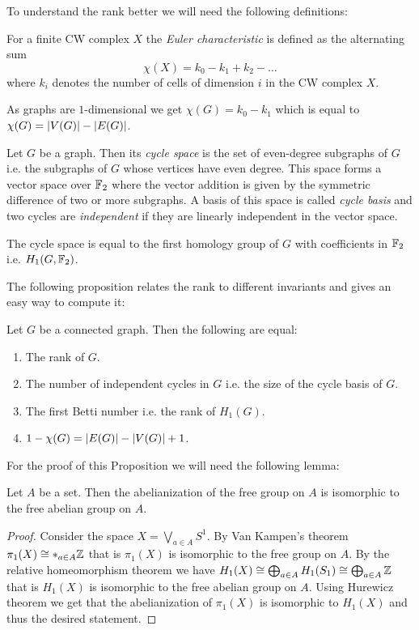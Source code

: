 To understand the rank better we will need the following definitions:
\begin{definition}
	For a finite CW complex $X$ the \emph{Euler characteristic} is defined as the alternating sum
	\[
		\chi(X) = k_0 - k_1 + k_2 - \ldots
	\] 
	where $k_{i}$ denotes the number of cells of dimension $i$ in the CW complex $X$.
\end{definition}
As graphs are $1$-dimensional we get $\chi (G) = k_0 - k_1$ which is equal to $\chi(G) = \abs{V(G)} - \abs{E(G)}$.

\begin{definition}
	Let $G$ be a graph. Then its \emph{cycle space} is the set of even-degree subgraphs of $G$ i.e. the subgraphs of $G$ whose vertices have even degree. 
	This space forms a vector space over $\mathbb{F}_2$ where the vector addition is given by the symmetric difference of two or more subgraphs.
	A basis of this space is called \emph{cycle basis} and two cycles are \emph{independent} if they are linearly independent in the vector space.
\end{definition}

\begin{remark}
	The cycle space is equal to the first homology group of $G$ with coefficients in $\mathbb{F}_2$ i.e. $H_1(G,\mathbb{F}_2)$.
\end{remark}

The following proposition relates the rank to different invariants and gives an easy way to compute it: 
\begin{proposition}\label{prop:rank}
	Let $G$ be a connected graph. Then the following are equal:
	\begin{enumerate}
		\item The rank of $G$.
		\item The number of independent cycles in $G$ i.e. the size of the cycle basis of $G$.
		\item The first Betti number i.e. the rank of $H_{1}(G)$.
		\item $1 - \chi(G) = \abs{E(G)} - \abs{V(G)} + 1$.
	\end{enumerate}
\end{proposition}

For the proof of this Proposition we will need the following lemma:
\begin{lemma}
	Let $A$ be a set. Then the abelianization of the free group on $A$ is isomorphic to the free abelian group on $A$.
\end{lemma}

\begin{proof}
	Consider the space $X = \bigvee_{a \in A} S^{1}$. By Van Kampen's theorem $\pi_1(X) \cong *_{a \in A} \mathbb{Z}$ that is $\pi_1(X)$ is isomorphic to the free group on $A$.
	By the relative homeomorphism theorem we have $H_1(X) \cong \bigoplus_{a \in A} H_1(S_1) \cong \bigoplus_{a \in A} \mathbb{Z}$ 
	that is $H_1(X)$ is isomorphic to the free abelian group on $A$.
	Using Hurewicz theorem we get that the abelianization of $\pi_1(X)$ is isomorphic to $H_1(X)$ and thus the desired statement.
\end{proof}

